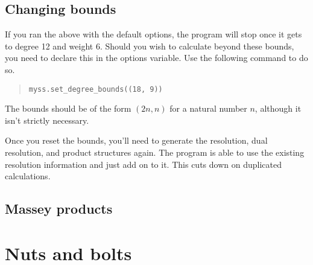 \documentclass{article}
\begin{document}
\subsection{Changing bounds}

If you ran the above with the default options, the program will stop
once it gets to degree 12 and weight 6. Should you wish to calculate
beyond these bounds, you need to declare this in the options
variable. Use the following command to do so. 
\begin{quote}
\begin{verbatim}
myss.set_degree_bounds((18, 9))
\end{verbatim}
\end{quote}
The bounds should be of the form $(2n, n)$ for a natural number $n$,
although it isn't strictly necessary.

Once you reset the bounds, you'll need to generate the resolution,
dual resolution, and product structures again. The program is able to
use the existing resolution information and just add on to it. This
cuts down on duplicated calculations.

\subsection{Massey products}

\section{Nuts and bolts}
\end{document}
